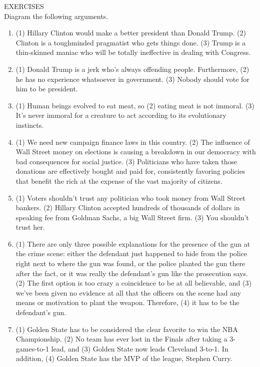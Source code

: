 EXERCISES \\

Diagram the following arguments.

\begin{enumerate}
\item (1) Hillary Clinton would make a better president than Donald Trump. (2) Clinton is a toughminded pragmatist who gets things done. (3) Trump is a thin-skinned maniac who will be totally
ineffective in dealing with Congress.

\item (1) Donald Trump is a jerk who's always offending people. Furthermore, (2) he has no
experience whatsoever in government. (3) Nobody should vote for him to be president.

\item (1) Human beings evolved to eat meat, so (2) eating meat is not immoral. (3) It's never immoral
for a creature to act according to its evolutionary instincts.

\item (1) We need new campaign finance laws in this country. (2) The influence of Wall Street money
on elections is causing a breakdown in our democracy with bad consequences for social justice.
(3) Politicians who have taken those donations are effectively bought and paid for, consistently
favoring policies that benefit the rich at the expense of the vast majority of citizens.

\item (1) Voters shouldn't trust any politician who took money from Wall Street bankers. (2) Hillary
Clinton accepted hundreds of thousands of dollars in speaking fee from Goldman Sachs, a big
Wall Street firm. (3) You shouldn't trust her.

\item (1) There are only three possible explanations for the presence of the gun at the crime scene:
either the defendant just happened to hide from the police right next to where the gun was found,
or the police planted the gun there after the fact, or it was really the defendant's gun like the
prosecution says. (2) The first option is too crazy a coincidence to be at all believable, and (3) we've
been given no evidence at all that the officers on the scene had any means or motivation to plant
the weapon. Therefore, (4) it has to be the defendant's gun.

\item (1) Golden State has to be considered the clear favorite to win the NBA Championship. (2) No
team has ever lost in the Finals after taking a 3-games-to-1 lead, and (3) Golden State now leads
Cleveland 3-to-1. In addition, (4) Golden State has the MVP of the league, Stephen Curry.


\end{enumerate}
